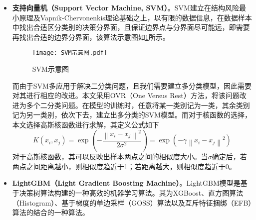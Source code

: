 \documentclass{MathorCupmodeling}
\begin{document}
\begin{itemize}
		\item \textbf{支持向量机（Support Vector Machine, SVM）}。SVM建立在结构风险最小原理及Vapnik-Chervonenkis理论基础之上\textcolor{blue}{\cite{psvm}}，以有限的数据信息，在数据样本中找出合适区分类别的决策分界面，且保证边界点与分界面尽可能远，即需要再找出合适的边界分界面，该算法示意图如\textcolor{blue}{\cref{fig:svmpicture}}所示。
		\begin{figure}[h!t]
			\centerline{\texttt{[image: SVM示意图.pdf]}}
			\caption{SVM示意图}\label{fig:svmpicture}
		\end{figure}
		而由于SVM多应用于解决二分类问题，且我们需要建立多分类模型，因此需要对其进行相应的改进。本文采用OVR（One Versus Rest）方法，将该问题改进为多个二分类问题\textcolor{blue}{\cite{psvm}}。在模型的训练时，任意将某一类别记为一类，其余类别记为另一类别，依次下去，建立出多分类的SVM模型。而对于核函数的选择，本文选择高斯核函数进行求解，其定义公式如下
		\begin{equation}
			K\left(x_i, x_j\right)=\exp \left(-\frac{\left\|x_i-x_j\right\|^{2}}{2\sigma^{2}}\right)=\exp \left(-\gamma \left\|x_i-x_j\right\|^{2}\right) \label{fgauss}
		\end{equation}
		对于高斯核函数，其可以反映出样本两点之间的相似度大小。当$\sigma$确定后，若两点之间距离越小，则相似度趋近于1；若距离越大，则相似度趋近于0。
		\item \textbf{LightGBM（Light Gradient Boosting Machine）}。LightGBM模型是基于决策树算法构建的一种高效的机器学习算法\textcolor{blue}{\cite{plightgbm}}。其为XGBoost、直方图算法（Histogram）、基于梯度的单边采样（GOSS）算法以及互斥特征捆绑（EFB）算法的结合的一种算法。
		

\end{itemize}
\end{document}
